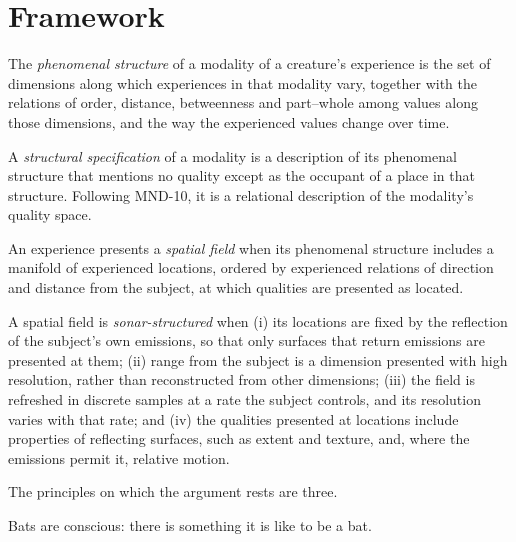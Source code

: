 \documentclass{situationist-preprint}
\begin{document}
\section{Framework}\label{s:framework}

\begin{definition}\label{d:struct}
The \emph{phenomenal structure} of a modality of a creature's experience is the set of dimensions along which experiences in that modality vary, together with the relations of order, distance, betweenness and part--whole among values along those dimensions, and the way the experienced values change over time.
\end{definition}

\begin{definition}\label{d:spec}
A \emph{structural specification} of a modality is a description of its phenomenal structure that mentions no quality except as the occupant of a place in that structure. Following MND-10, it is a relational description of the modality's quality space.
\end{definition}

\begin{definition}\label{d:field}
An experience presents a \emph{spatial field} when its phenomenal structure includes a manifold of experienced locations, ordered by experienced relations of direction and distance from the subject, at which qualities are presented as located.
\end{definition}

\begin{definition}\label{d:sonar}
A spatial field is \emph{sonar-structured} when (i) its locations are fixed by the reflection of the subject's own emissions, so that only surfaces that return emissions are presented at them; (ii) range from the subject is a dimension presented with high resolution, rather than reconstructed from other dimensions; (iii) the field is refreshed in discrete samples at a rate the subject controls, and its resolution varies with that rate; and (iv) the qualities presented at locations include properties of reflecting surfaces, such as extent and texture, and, where the emissions permit it, relative motion.
\end{definition}

The principles on which the argument rests are three.

\begin{principle}[Consciousness]\label{p:cons}
Bats are conscious: there is something it is like to be a bat.
\end{principle}
\end{document}
